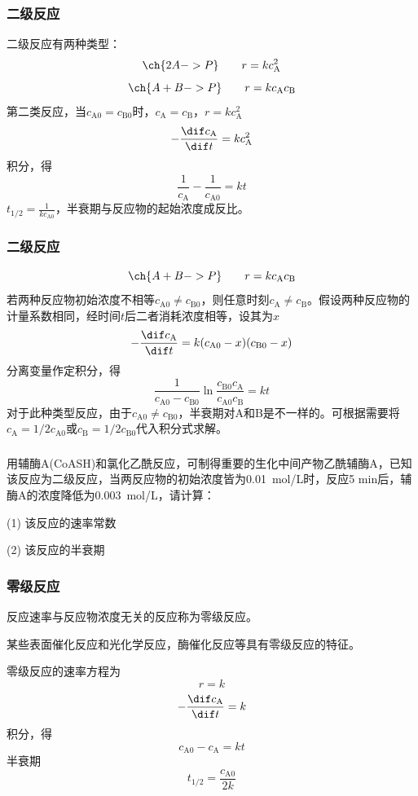\documentclass[dvipsnames, svgnames, x11names]{beamer}
\begin{document}
    \begin{frame}
        \frametitle{二级反应}
        二级反应有两种类型：
        \[
            \ch{2 A -> P} \qquad r = kc_\mathrm{A}^2
        \]
        \[
            \ch{A + B -> P} \qquad r = kc_\mathrm{A}c_\mathrm{B}
        \]
        第二类反应，当$c_\mathrm{A0} = c_\mathrm{B0}$时，$c_\mathrm{A} = c_\mathrm{B}$，$r = kc_\mathrm{A}^2$
        \[
            - \frac{\dif c_\mathrm{A}}{\dif t} = kc_\mathrm{A}^2
        \]
        积分，得    
        \[
            \frac{1}{c_{\mathrm{A}}} -\frac{1}{c_{\mathrm{A0}}} =kt
        \]
        $t_{1/2}=\frac{1}{kc_{\mathrm{A0}}}$，半衰期与反应物的起始浓度成反比。
    
    \end{frame}


    \begin{frame}
        \frametitle{二级反应}
        \[
            \ch{A + B -> P} \qquad r = kc_\mathrm{A}c_\mathrm{B}
        \]
        若两种反应物初始浓度不相等$c_\mathrm{A0} \neq c_\mathrm{B0}$，则任意时刻$c_\mathrm{A} \neq c_\mathrm{B}$。假设两种反应物的计量系数相同，经时间$t$后二者消耗浓度相等，设其为$x$
        \[
            - \frac{\dif c_\mathrm{A}}{\dif t} = k(c_\mathrm{A0}-x)(c_\mathrm{B0}-x)
        \]
        分离变量作定积分，得
        \[
            \frac{1}{c_\mathrm{A0} - c_\mathrm{B0}}\ln \frac{c_\mathrm{B0}c_\mathrm{A}}{c_\mathrm{A0}c_\mathrm{B}} =kt
        \]
        对于此种类型反应，由于$c_\mathrm{A0} \neq c_\mathrm{B0}$，半衰期对A和B是不一样的。可根据需要将$c_\mathrm{A}=1/2c_\mathrm{A0}$或$c_\mathrm{B}=1/2c_\mathrm{B0}$代入积分式求解。
        
    \end{frame}
    

    \begin{frame}[t]
        \frametitle{}
        \begin{example}
            用辅酶A(CoASH)和氯化乙酰反应，可制得重要的生化中间产物乙酰辅酶A，已知该反应为二级反应，当两反应物的初始浓度皆为\SI{0.01}{mol/L}时，反应5 min后，辅酶A的浓度降低为\SI{0.003}{mol/L}，请计算：

            (1) 该反应的速率常数

            (2) 该反应的半衰期
        \end{example}
    \end{frame}

    
    \begin{frame}
        \frametitle{零级反应}
    
        反应速率与反应物浓度无关的反应称为零级反应。
        
        某些表面催化反应和光化学反应，酶催化反应等具有零级反应的特征。
        
        零级反应的速率方程为
        \[
           r = k
        \]
        \[
            - \frac{\dif c_\mathrm{A}}{\dif t} = k
        \]
        积分，得
        \[
            c_{\mathrm{A0}} - c_{\mathrm{A}} = kt
        \]
        半衰期
        \[
            t_{1/2}=\frac{c_{\mathrm{A0}}}{2k}
        \]
    
    \end{frame}
    
\end{document}
